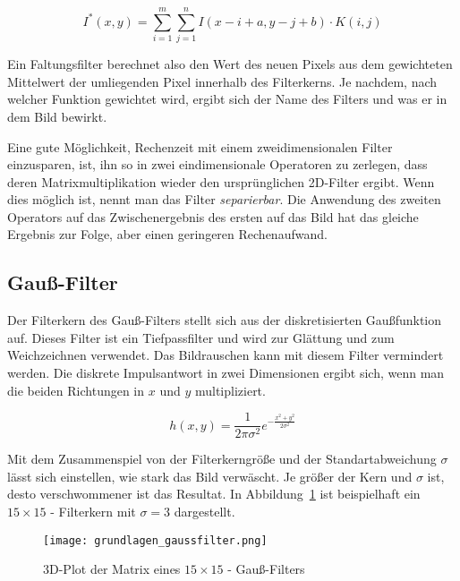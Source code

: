 \begin{equation}
I^{\ast}(x,y) = \sum_{i=1}^{m} \sum_{j=1}^{n} I(x-i+a, y-j+b) \cdot K(i,j)
\end{equation}

Ein Faltungsfilter berechnet also den Wert des neuen Pixels aus dem gewichteten Mittelwert der umliegenden Pixel innerhalb des Filterkerns. Je nachdem, nach welcher Funktion gewichtet wird, ergibt sich der Name des Filters und was er in dem Bild bewirkt. 

Eine gute Möglichkeit, Rechenzeit mit einem zweidimensionalen Filter einzusparen, ist, ihn so in zwei eindimensionale Operatoren zu zerlegen, dass deren Matrixmultiplikation wieder den ursprünglichen 2D-Filter ergibt. Wenn dies möglich ist, nennt man das Filter \emph{separierbar}. Die Anwendung des zweiten Operators auf das Zwischenergebnis des ersten auf das Bild hat das gleiche Ergebnis zur Folge, aber einen geringeren Rechenaufwand.

\subsection{Gauß-Filter}

Der Filterkern des Gauß-Filters stellt sich aus der diskretisierten Gaußfunktion auf. Dieses Filter ist ein Tiefpassfilter und wird zur Glättung und zum Weichzeichnen verwendet. Das Bildrauschen kann mit diesem Filter vermindert werden. Die diskrete Impulsantwort in zwei Dimensionen ergibt sich, wenn man die beiden Richtungen in \( x\) und \( y \) multipliziert.

\begin{equation}
h(x,y) = \frac{1}{2\pi\sigma^2} e^{-\frac{x^2+y^2}{2\sigma^2}}
\end{equation}

Mit dem Zusammenspiel von der Filterkerngröße und der Standartabweichung \( \sigma \) lässt sich einstellen, wie stark das Bild verwäscht. Je größer der Kern und \( \sigma \) ist, desto verschwommener ist das Resultat. In Abbildung~\ref{fig:grundlagen_gaussfilter} ist beispielhaft ein \( 15\times15\) - Filterkern mit \( \sigma = 3\) dargestellt.

\begin{figure}[H] %
  \centering
  \texttt{[image: grundlagen\_gaussfilter.png]}
  \caption{3D-Plot der Matrix eines \( 15\times15\) - Gauß-Filters}
  \label{fig:grundlagen_gaussfilter}
\end{figure}  

